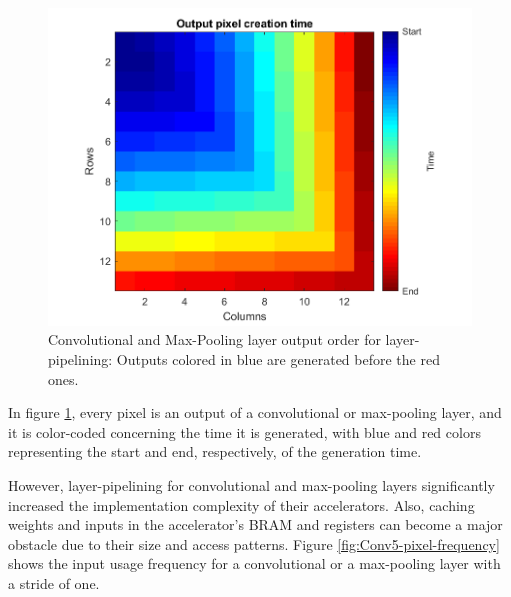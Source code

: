 \begin{figure} [H]
	\centering
	\includegraphics[width=\textwidth]{../Images/Scheduling/Conv5-output-creation-time.png}
	\decoRule
	\caption[Convolutional and Max-Pooling layer output order for layer-pipelining]{Convolutional and Max-Pooling layer output order for layer-pipelining: Outputs colored in blue are generated before the red ones.}
	\label{fig:output-generation-order}
\end{figure}

In figure \ref{fig:output-generation-order}, every pixel is an output of a convolutional or max-pooling layer, and it is color-coded concerning the time it is generated, with blue and red colors representing the start and end, respectively, of the generation time.

However, layer-pipelining for convolutional and max-pooling layers significantly increased the implementation complexity of their accelerators. Also, caching weights and inputs in the accelerator's BRAM and registers can become a major obstacle due to their size and access patterns. Figure \ref{fig:Conv5-pixel-frequency} shows the input usage frequency for a convolutional or a max-pooling layer with a stride of one.

